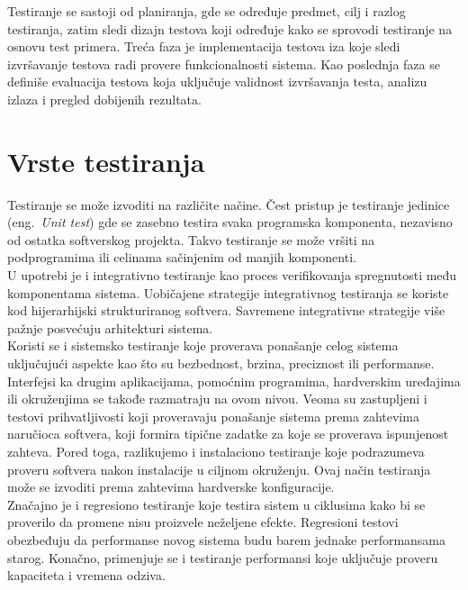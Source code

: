\documentclass[a4paper]{article}
\begin{document}
{Testiranje se sastoji od planiranja, gde se određuje predmet, cilj i razlog testiranja, zatim sledi dizajn testova koji određuje kako se sprovodi testiranje na osnovu test primera. Treća faza je implementacija testova iza koje sledi izvršavanje testova radi provere funkcionalnosti sistema. Kao poslednja faza se definiše evaluacija testova koja uključuje validnost izvršavanja testa, analizu izlaza i pregled dobijenih rezultata.

\section{Vrste testiranja}
\label{sec:vrste_testiranja}
Testiranje se može izvoditi na različite načine. Čest pristup je testiranje jedinice (eng.~{\em Unit test}) gde se zasebno testira svaka programska 
komponenta, nezavisno od ostatka softverskog projekta. Takvo testiranje se može vršiti na podprogramima ili celinama sačinjenim od manjih komponenti.\\

U upotrebi je i integrativno testiranje kao proces verifikovanja spregnutosti među komponentama sistema. Uobičajene strategije integrativnog testiranja se koriste kod hijerarhijski strukturiranog softvera. Savremene integrativne strategije više pažnje posvećuju arhitekturi sistema.\\

Koristi se i sistemsko testiranje koje proverava ponašanje celog sistema uključujući aspekte kao što su bezbednost, brzina, preciznost ili performanse. Interfejsi ka drugim aplikacijama, pomoćnim programima, hardverskim uređajima ili okruženjima se takođe razmatraju na ovom nivou. Veoma su zastupljeni i testovi prihvatljivosti koji proveravaju ponašanje sistema prema zahtevima naručioca softvera, koji formira tipične zadatke za koje se proverava ispunjenost zahteva. Pored toga, razlikujemo i instalaciono testiranje koje podrazumeva proveru softvera nakon instalacije u ciljnom okruženju. Ovaj način testiranja može se izvoditi prema zahtevima hardverske konfiguracije. \\

Značajno je i regresiono testiranje koje testira sistem u ciklusima kako bi se proverilo da promene nisu proizvele neželjene efekte. Regresioni testovi obezbeđuju da performanse novog sistema budu barem jednake performansama starog. Konačno, primenjuje se i testiranje performansi koje uključuje proveru kapaciteta i vremena odziva. \\

}
\end{document}
